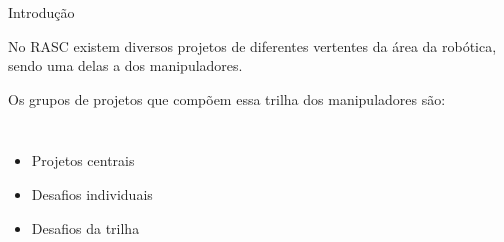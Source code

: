 \begin{frame}[t]{Introdução} 

    No RASC existem diversos projetos de diferentes vertentes da área da robótica, sendo uma delas a dos manipuladores.
    \vspace*{0.3cm}

    Os grupos de projetos que compõem essa trilha dos manipuladores são:
        \begin{columns}[t]
            \begin{itemize}
                \item Projetos centrais
                \item Desafios individuais
                \item Desafios da trilha
            \end{itemize}
            \begin{center}
                \begin{figure}
                \end{figure}
            \end{center}
        \end{columns}
\end{frame}
\begin{frame}[c]{} 
   
    \begin{center}
    \end{center}
       
\end{frame}
